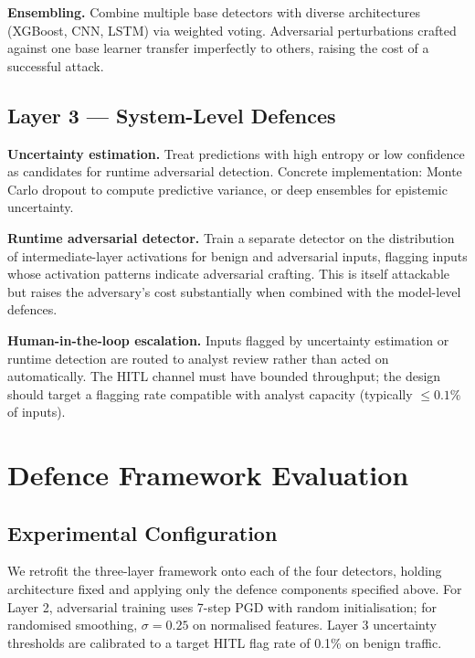 \documentclass[sigconf,nonacm]{acmart}
\begin{document}
\textbf{Ensembling.} Combine multiple base detectors with diverse
architectures (XGBoost, CNN, LSTM) via weighted voting. Adversarial
perturbations crafted against one base learner transfer imperfectly to
others, raising the cost of a successful attack.

\subsection{Layer 3 — System-Level Defences}

\textbf{Uncertainty estimation.} Treat predictions with high entropy or low
confidence as candidates for runtime adversarial detection. Concrete
implementation: Monte Carlo dropout to compute predictive variance, or deep
ensembles for epistemic uncertainty.

\textbf{Runtime adversarial detector.} Train a separate detector on the
distribution of intermediate-layer activations for benign and adversarial
inputs, flagging inputs whose activation patterns indicate adversarial
crafting. This is itself attackable but raises the adversary's cost
substantially when combined with the model-level defences.

\textbf{Human-in-the-loop escalation.} Inputs flagged by uncertainty estimation
or runtime detection are routed to analyst review rather than acted on
automatically. The HITL channel must have bounded throughput; the design
should target a flagging rate compatible with analyst capacity (typically
$\leq 0.1\%$ of inputs).

\section{Defence Framework Evaluation}
\label{sec:defeval}

\subsection{Experimental Configuration}

We retrofit the three-layer framework onto each of the four detectors,
holding architecture fixed and applying only the defence components specified
above. For Layer 2, adversarial training uses 7-step PGD with random
initialisation; for randomised smoothing, $\sigma = 0.25$ on normalised
features. Layer 3 uncertainty thresholds are calibrated to a target HITL flag
rate of 0.1\% on benign traffic.
\end{document}
